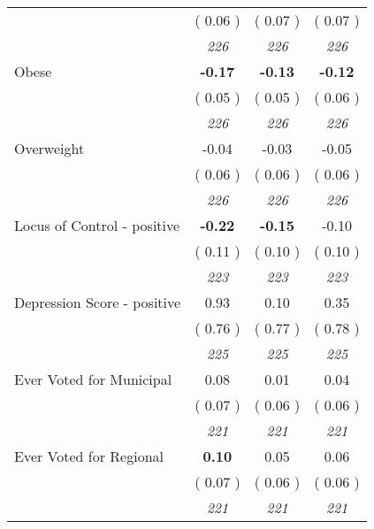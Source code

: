 \begin{tabular}{l c c c}
& (     0.06 ) & (     0.07 ) & (     0.07 ) \\
& \textit{ 226 } & \textit{ 226 } & \textit{ 226 } \\
Obese & \textbf{     -0.17 } & \textbf{     -0.13 } & \textbf{     -0.12 } \\
& (     0.05 ) & (     0.05 ) & (     0.06 ) \\
& \textit{ 226 } & \textit{ 226 } & \textit{ 226 } \\
Overweight &     -0.04 &     -0.03 &     -0.05 \\
& (     0.06 ) & (     0.06 ) & (     0.06 ) \\
& \textit{ 226 } & \textit{ 226 } & \textit{ 226 } \\
Locus of Control - positive & \textbf{     -0.22 } & \textbf{     -0.15 } &     -0.10 \\
& (     0.11 ) & (     0.10 ) & (     0.10 ) \\
& \textit{ 223 } & \textit{ 223 } & \textit{ 223 } \\
Depression Score - positive &      0.93 &      0.10 &      0.35 \\
& (     0.76 ) & (     0.77 ) & (     0.78 ) \\
& \textit{ 225 } & \textit{ 225 } & \textit{ 225 } \\
Ever Voted for Municipal &      0.08 &      0.01 &      0.04 \\
& (     0.07 ) & (     0.06 ) & (     0.06 ) \\
& \textit{ 221 } & \textit{ 221 } & \textit{ 221 } \\
Ever Voted for Regional & \textbf{      0.10 } &      0.05 &      0.06 \\
& (     0.07 ) & (     0.06 ) & (     0.06 ) \\
& \textit{ 221 } & \textit{ 221 } & \textit{ 221 } \\
\bottomrule
\end{tabular}
